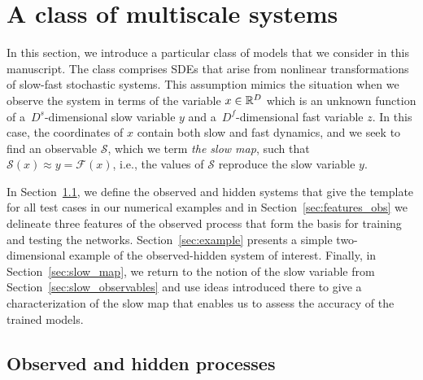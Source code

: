 \documentclass{article}
\newcommand{\obs}{\mathcal{F}} %
\newcommand{\smap}{\mathcal{S}} %
\begin{document}
\section{A class of multiscale systems}\label{sec:ms_class}
In this section, we introduce a particular class of models that we consider in this manuscript. The class comprises SDEs that arise from nonlinear transformations of slow-fast stochastic systems. This assumption mimics the situation when we observe the system in terms of the variable $x\in\mathbb{R}^D$ which is an unknown function of a~$D^s$-dimensional slow variable $y$ and a~$D^f$-dimensional fast variable $z$. In this case, the coordinates of $x$ contain both slow and fast dynamics, and we seek to find an observable $\smap$, which we term \emph{the slow map}, such that $\smap(x)\approx y=\obs(x)$, i.e., the values of $\smap$ reproduce the slow variable $y$.

In Section~\ref{sec:obs_hid}, we define the observed and hidden systems that give the template for all test cases in our numerical examples and in Section~\ref{sec:features_obs} we delineate three features of the observed process that form the basis for training and testing the networks. Section~\ref{sec:example} presents a simple two-dimensional example of the observed-hidden system of interest. Finally, in Section~\ref{sec:slow_map}, we return to the notion of the slow variable from Section~\ref{sec:slow_observables} and use ideas introduced there to give a characterization of the slow map that enables us to assess the accuracy of the trained models.

\subsection{Observed and hidden processes}
\label{sec:obs_hid}
\end{document}
